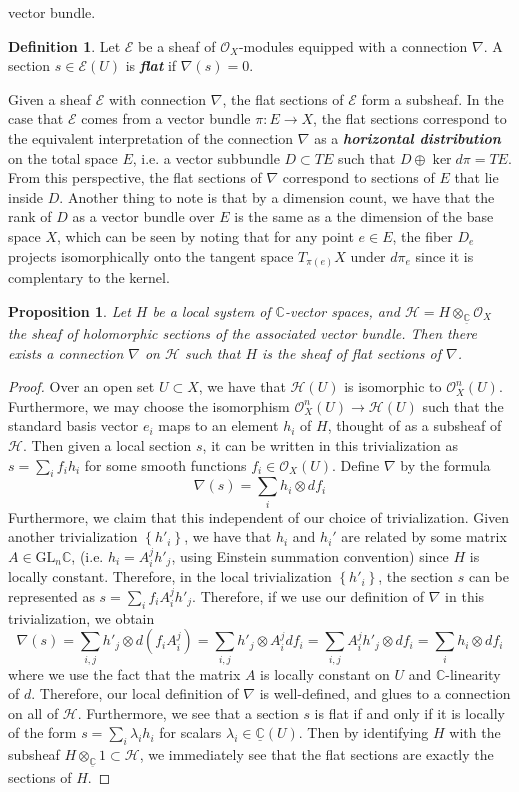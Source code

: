 \documentclass[psamsfonts, 12pt]{amsart}
\newtheorem{prop}[thm]{Proposition}
\theoremstyle{definition}
\newtheorem{defn}[thm]{Definition}
\theoremstyle{remark}
\renewcommand{\O}{\mathcal{O}}
\newcommand{\ib}[1]{\textbf{\textit{#1}}}
\newcommand{\C}{\mathbb{C}}
\newcommand{\GL}{\mathrm{GL}}
\newcommand{\set}[1]{\left\lbrace #1 \right\rbrace}
\begin{document}
vector bundle.
%
\begin{defn}
Let $\mathcal{E}$ be a sheaf of $\O_X$-modules equipped with a connection $\nabla$.
A section $s \in \mathcal{E}(U)$ is \ib{flat} if $\nabla(s) = 0$.
\end{defn}
%
Given a sheaf $\mathcal{E}$ with connection $\nabla$, the flat sections
of $\mathcal{E}$ form a subsheaf. In the case that $\mathcal{E}$ comes from a
vector bundle $\pi : E \to X$, the flat sections correspond to the equivalent
interpretation of the connection $\nabla$ as a \ib{horizontal distribution} on
the total space $E$, i.e. a vector subbundle $D \subset TE$ such that
$D \oplus \ker d\pi = TE$. From this perspective, the flat sections of $\nabla$
correspond to sections of $E$ that lie inside $D$. Another thing to note is
that by a dimension count, we have that the rank of $D$ as a vector bundle
over $E$ is the same as a the dimension of the base space $X$, which can be
seen by noting that for any point $e \in E$, the fiber $D_e$ projects isomorphically
onto the tangent space $T_{\pi(e)}X$ under $d\pi_e$ since it is complentary to the
kernel.
%
\begin{prop}
Let $H$ be a local system of $\C$-vector spaces, and
$\mathcal{H} = H \otimes_{\underline{\C}} \O_X$ the sheaf of holomorphic sections of
the associated vector bundle. Then there exists a connection $\nabla$ on $\mathcal{H}$
such that $H$ is the sheaf of flat sections of $\nabla$.
\end{prop}
%
\begin{proof}
Over an open set $U \subset X$, we have that $\mathcal{H}(U)$ is isomorphic to
$\O_X^n(U)$. Furthermore, we may choose the isomorphism $\O^n_X(U) \to \mathcal{H}(U)$
such that the standard basis vector $e_i$ maps to an element $h_i$ of $H$, thought
of as a subsheaf of $\mathcal{H}$. Then given a local section $s$, it can
be written in this trivialization as $s = \sum_i f_ih_i$ for some smooth
functions $f_i \in \O_X(U)$. Define $\nabla$ by the formula
\[
\nabla(s) = \sum_i h_i \otimes df_i
\]
Furthermore, we claim that this independent of our choice of trivialization. Given
another trivialization $\set{h'_i}$, we have that $h_i$ and $h_i'$ are related by
some matrix $A \in \GL_n\C$, (i.e. $h_i = A_i^jh'_j$, using Einstein summation
convention) since $H$ is locally constant. Therefore, in the
local trivialization $\set{h'_i}$, the section $s$ can be represented as
$s = \sum_if_iA^j_ih'_j$. Therefore, if we use our definition of $\nabla$
in this trivialization, we obtain
\[
\nabla(s) = \sum_{i,j} h'_j \otimes d(f_iA^j_i) = \sum_{i,j} h'_j \otimes A^j_i df_i
= \sum_{i,j} A^j_ih'_j \otimes df_i = \sum_i h_i \otimes df_i
\]
where we use the fact that the matrix $A$ is locally constant on $U$ and $\C$-linearity
of $d$. Therefore, our local definition of $\nabla$ is well-defined, and glues to a
connection on all of $\mathcal{H}$. Furthermore, we see that a section $s$ is flat if
and only if it is locally of the form $s = \sum_i \lambda_ih_i$ for scalars
$\lambda_i \in \underline{\C}(U)$. Then by identifying $H$ with the subsheaf
$H \otimes_{\underline{\C}} 1 \subset \mathcal{H}$, we immediately see that
the flat sections are exactly the sections of $H$.
\end{proof}
\end{document}

